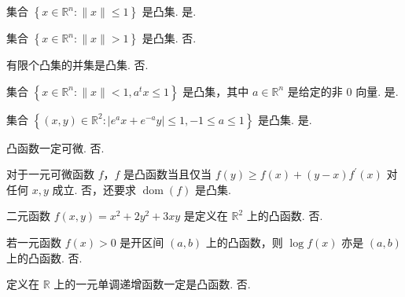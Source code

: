 

\usepackage{tikz}

\newcommand{\Title}{CVX final 2021}
\renewcommand{\due}{due: 11 weeks}
\newcommand{\tr}{\operatorname{tr}} %
\newcommand{\dom}{\operatorname{dom}} %
\newcommand{\minimize}{\operatorname{minimize}} %
\newcommand{\subject}{\operatorname{subject\ to}}

\newcommand{\todo}{{\color{red} to do}} %
\newcommand{\myline}{{\line(1,0){450}}} %




\begin{problem}[判断]
    集合 $\left\{x \in \mathbb{R}^n: \|x\| \le 1\right\}$ 是凸集.
    \Answer 是.
\end{problem}

\begin{problem}[判断]
    集合 $\left\{x \in \mathbb{R}^n: \|x\| > 1\right\}$ 是凸集.
    \Answer 否.
\end{problem}

\begin{problem}[判断]
    有限个凸集的并集是凸集.
    \Answer 否.
\end{problem}

\begin{problem}[判断]
    集合 $\left\{x \in \mathbb{R}^n: \|x\| < 1, a^tx \le 1\right\}$ 是凸集，其中 $a \in \mathbb{R}^n$ 是给定的非 0 向量.
    \Answer 是.
\end{problem}

\begin{problem}[判断]
    集合 $\left\{(x, y) \in \mathbb{R}^2: |e^ax + e^{-a}y| \le 1, -1 \le a \le 1\right\}$ 是凸集.
    \Answer 是.
\end{problem}

\begin{problem}[判断]
    凸函数一定可微.
    \Answer 否.
\end{problem}

\begin{problem}[判断]
    对于一元可微函数 $f$，$f$ 是凸函数当且仅当 $f(y) \ge f(x) + (y - x)f^\prime(x)$ 对任何 $x, y$ 成立.
    \Answer 否，还要求 $\dom(f)$ 是凸集.
\end{problem}

\begin{problem}[判断]
    二元函数 $f(x, y) = x^2 + 2y^2 + 3xy$ 是定义在 $\mathbb{R}^2$ 上的凸函数.
    \Answer 否.
\end{problem}

\begin{problem}[判断]
    若一元函数 $f(x) > 0$ 是开区间 $(a, b)$ 上的凸函数，则 $\log f(x)$ 亦是 $(a, b)$ 上的凸函数.
    \Answer 否.
\end{problem}

\begin{problem}[判断]
    定义在 $\mathbb{R}$ 上的一元单调递增函数一定是凸函数.
    \Answer 否.
\end{problem}

